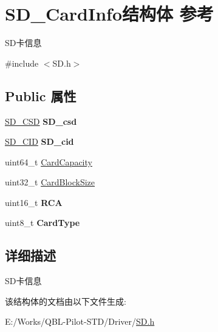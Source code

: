 \hypertarget{struct_s_d___card_info}{}\section{S\+D\+\_\+\+Card\+Info结构体 参考}
\label{struct_s_d___card_info}


S\+D卡信息  




{\ttfamily \#include $<$S\+D.\+h$>$}

\subsection*{Public 属性}
\begin{DoxyCompactItemize}
\item 
\hyperlink{struct_s_d___c_s_d}{S\+D\+\_\+\+C\+SD} {\bfseries S\+D\+\_\+csd}
\item 
\hyperlink{struct_s_d___c_i_d}{S\+D\+\_\+\+C\+ID} {\bfseries S\+D\+\_\+cid}
\item 
uint64\+\_\+t \hyperlink{group__sd__card_ga536fbe580a6c824e73a2c3c4cf5b40c6}{Card\+Capacity}
\item 
uint32\+\_\+t \hyperlink{group__sd__card_ga610fdab86929f0fc26881d564b19d609}{Card\+Block\+Size}
\item 
uint16\+\_\+t {\bfseries R\+CA}
\item 
uint8\+\_\+t {\bfseries Card\+Type}
\end{DoxyCompactItemize}


\subsection{详细描述}
S\+D卡信息 

该结构体的文档由以下文件生成\+:\begin{DoxyCompactItemize}
\item 
E\+:/\+Works/\+Q\+B\+L-\/\+Pilot-\/\+S\+T\+D/\+Driver/\hyperlink{_s_d_8h}{S\+D.\+h}\end{DoxyCompactItemize}
